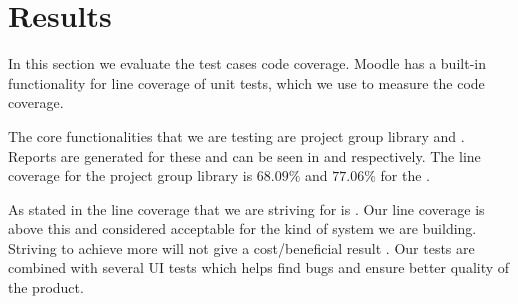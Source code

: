 \section{Results}
\label{sec:results}
In this section we evaluate the test cases code coverage. 
Moodle has a built-in functionality for line coverage of unit tests, which we use to measure the code coverage.

The core functionalities that we are testing are project group library and \admlib{}.
Reports are generated for these and can be seen in  and  respectively.
The line coverage for the project group library is $68.09\%$ and $77.06\%$ for the \admlib{}.

As stated in  the line coverage that we are striving for is \idealCC{}.
Our line coverage is above this and considered acceptable for the kind of system we are building. 
Striving to achieve more will not give a cost/beneficial result . 
Our tests are combined with several UI tests which helps find bugs and ensure better quality of the product. 
